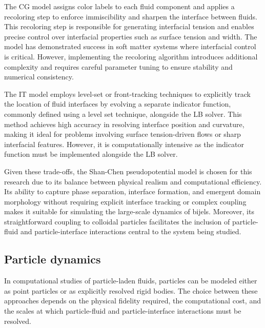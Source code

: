 The CG model assigns color labels to each fluid component and applies a recoloring step to enforce immiscibility and sharpen the interface 
between fluids. 
\cite{mora_optimal_2021, latva-kokko_static_2005, huang_study_2014, liu_multiphase_2016}
This recoloring step is responsible for generating interfacial tension and enables precise control over interfacial properties such 
as surface tension and width. The model has demonstrated success in soft matter systems where interfacial control is critical. However, implementing 
the recoloring algorithm introduces additional complexity and requires careful parameter tuning to ensure stability and numerical consistency. \cite{mora_optimal_2021}

The IT model employs level-set or front-tracking techniques to explicitly track the location of fluid interfaces by evolving a separate indicator 
function, commonly defined using a level set technique, alongside the LB solver. \cite{haghani_hassan_abadi_conservative_2018, liang_lattice_2023}
This method achieves high accuracy in resolving interface position and curvature, making it ideal for problems 
involving surface tension-driven flows or sharp interfacial features. However, it is computationally intensive as the indicator function must be implemented alongside
the LB solver. 

Given these trade-offs, the Shan-Chen pseudopotential model is chosen for this research due to its balance between physical realism and computational 
efficiency. \cite{jansen_bijels_2011,gunther_timescales_2014, gunther_lattice_2013, xie_direct_2017}
Its ability to capture phase separation, interface formation, and emergent domain morphology without requiring explicit interface 
tracking or complex coupling makes it suitable for simulating the large-scale dynamics of bijels. Moreover, its straightforward coupling to 
colloidal particles facilitates the inclusion of particle-fluid and particle-interface interactions central to the system being studied.

\subsection{Particle dynamics}

In computational studies of particle-laden fluids, particles can be modeled either as point particles or as explicitly resolved rigid bodies. The choice between 
these approaches depends on the physical fidelity required, the computational cost, and the scales at which particle-fluid and particle-interface interactions must be resolved.

